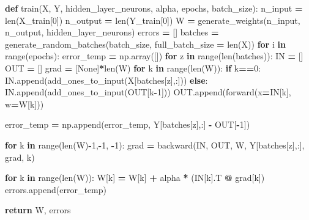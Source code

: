 \documentclass[
]{book}
\newenvironment{Shaded}{\begin{snugshade}}{\end{snugshade}}
\newcommand{\BuiltInTok}[1]{#1}
\newcommand{\ControlFlowTok}[1]{\textcolor[rgb]{0.13,0.29,0.53}{\textbf{#1}}}
\newcommand{\DecValTok}[1]{\textcolor[rgb]{0.00,0.00,0.81}{#1}}
\newcommand{\KeywordTok}[1]{\textcolor[rgb]{0.13,0.29,0.53}{\textbf{#1}}}
\newcommand{\NormalTok}[1]{#1}
\newcommand{\OperatorTok}[1]{\textcolor[rgb]{0.81,0.36,0.00}{\textbf{#1}}}
\newcommand{\VariableTok}[1]{\textcolor[rgb]{0.00,0.00,0.00}{#1}}
\begin{document}
\begin{Shaded}
\begin{Highlighting}[]
\KeywordTok{def}\NormalTok{ train(X, Y, hidden\_layer\_neurons, alpha, epochs, batch\_size):}
\NormalTok{  n\_input }\OperatorTok{=} \BuiltInTok{len}\NormalTok{(X\_train[}\DecValTok{0}\NormalTok{])}
\NormalTok{  n\_output }\OperatorTok{=} \BuiltInTok{len}\NormalTok{(Y\_train[}\DecValTok{0}\NormalTok{])}
\NormalTok{  W }\OperatorTok{=}\NormalTok{ generate\_weights(n\_input, n\_output, hidden\_layer\_neurons)}
\NormalTok{  errors }\OperatorTok{=}\NormalTok{ []}
\NormalTok{  batches }\OperatorTok{=}\NormalTok{ generate\_random\_batches(batch\_size, full\_batch\_size }\OperatorTok{=} \BuiltInTok{len}\NormalTok{(X))}
  \ControlFlowTok{for}\NormalTok{ i }\KeywordTok{in} \BuiltInTok{range}\NormalTok{(epochs):}
\NormalTok{    error\_temp }\OperatorTok{=}\NormalTok{ np.array([])}
    \ControlFlowTok{for}\NormalTok{ z }\KeywordTok{in} \BuiltInTok{range}\NormalTok{(}\BuiltInTok{len}\NormalTok{(batches)):}
\NormalTok{      IN }\OperatorTok{=}\NormalTok{ []}
\NormalTok{      OUT }\OperatorTok{=}\NormalTok{ []}
\NormalTok{      grad }\OperatorTok{=}\NormalTok{ [}\VariableTok{None}\NormalTok{]}\OperatorTok{*}\BuiltInTok{len}\NormalTok{(W)}
      \ControlFlowTok{for}\NormalTok{ k }\KeywordTok{in} \BuiltInTok{range}\NormalTok{(}\BuiltInTok{len}\NormalTok{(W)):}
        \ControlFlowTok{if}\NormalTok{ k}\OperatorTok{==}\DecValTok{0}\NormalTok{:}
\NormalTok{          IN.append(add\_ones\_to\_input(X[batches[z],:]))}
        \ControlFlowTok{else}\NormalTok{:}
\NormalTok{          IN.append(add\_ones\_to\_input(OUT[k}\OperatorTok{{-}}\DecValTok{1}\NormalTok{]))}
\NormalTok{        OUT.append(forward(x}\OperatorTok{=}\NormalTok{IN[k], w}\OperatorTok{=}\NormalTok{W[k]))}
        
\NormalTok{      error\_temp }\OperatorTok{=}\NormalTok{ np.append(error\_temp, Y[batches[z],:] }\OperatorTok{{-}}\NormalTok{ OUT[}\OperatorTok{{-}}\DecValTok{1}\NormalTok{])}
        
      \ControlFlowTok{for}\NormalTok{ k }\KeywordTok{in} \BuiltInTok{range}\NormalTok{(}\BuiltInTok{len}\NormalTok{(W)}\OperatorTok{{-}}\DecValTok{1}\NormalTok{,}\OperatorTok{{-}}\DecValTok{1}\NormalTok{, }\OperatorTok{{-}}\DecValTok{1}\NormalTok{):}
\NormalTok{        grad }\OperatorTok{=}\NormalTok{ backward(IN, OUT, W, Y[batches[z],:], grad, k) }
        
      \ControlFlowTok{for}\NormalTok{ k }\KeywordTok{in} \BuiltInTok{range}\NormalTok{(}\BuiltInTok{len}\NormalTok{(W)):}
\NormalTok{        W[k] }\OperatorTok{=}\NormalTok{ W[k] }\OperatorTok{+}\NormalTok{ alpha }\OperatorTok{*}\NormalTok{ (IN[k].T }\OperatorTok{@}\NormalTok{ grad[k])}
\NormalTok{    errors.append(error\_temp)}
    
  \ControlFlowTok{return}\NormalTok{ W, errors}
\end{Highlighting}
\end{Shaded}
\end{document}
